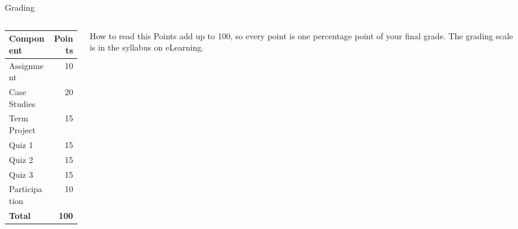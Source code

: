 \begin{frame}{ Grading}
    \begin{columns}[c]
        \begin{column}{0.42\textwidth}
            \centering
            \renewcommand{\arraystretch}{1.15}
            \begin{tabular}{@{}lr@{}}
                \toprule
                \textbf{Component} & \textbf{Points} \\
                \midrule
                Assignment      & 10 \\
                Case Studies    & 20 \\
                Term Project    & 15 \\
                Quiz 1          & 15 \\
                Quiz 2          & 15 \\
                Quiz 3          & 15 \\
                Participation   & 10 \\
                \midrule
                \textbf{Total}  & \textbf{100} \\
                \bottomrule
            \end{tabular}
        \end{column}
        \begin{column}{0.5\textwidth}
            \begin{block}{\enspace How to read this}
                \small
                Points add up to 100, so every point is one percentage point of your final grade.
                The grading scale is in the syllabus on eLearning.
            \end{block}
        \end{column}
    \end{columns}
\end{frame}

